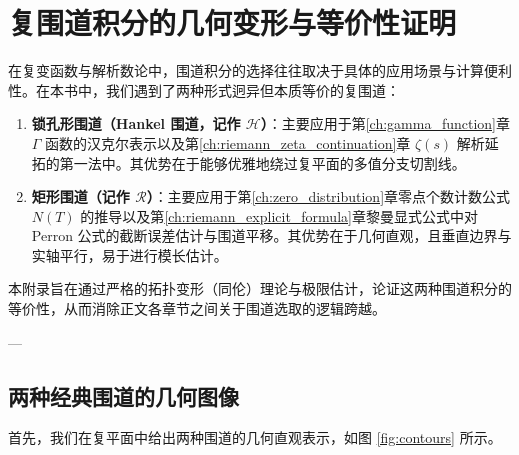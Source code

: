 

\chapter{复围道积分的几何变形与等价性证明}
\label{app:contour}

在复变函数与解析数论中，围道积分的选择往往取决于具体的应用场景与计算便利性。在本书中，我们遇到了两种形式迥异但本质等价的复围道：
\begin{enumerate}
    \item \textbf{锁孔形围道（Hankel 围道，记作 $\mathcal{H}$）}：主要应用于第\ref{ch:gamma_function}章 $\Gamma$ 函数的汉克尔表示以及第\ref{ch:riemann_zeta_continuation}章 $\zeta(s)$ 解析延拓的第一法中。其优势在于能够优雅地绕过复平面的多值分支切割线。
    \item \textbf{矩形围道（记作 $\mathcal{R}$）}：主要应用于第\ref{ch:zero_distribution}章零点个数计数公式 $N(T)$ 的推导以及第\ref{ch:riemann_explicit_formula}章黎曼显式公式中对 Perron 公式的截断误差估计与围道平移。其优势在于几何直观，且垂直边界与实轴平行，易于进行模长估计。
\end{enumerate}

本附录旨在通过严格的拓扑变形（同伦）理论与极限估计，论证这两种围道积分的等价性，从而消除正文各章节之间关于围道选取的逻辑跨越。

---

\section{两种经典围道的几何图像}

首先，我们在复平面中给出两种围道的几何直观表示，如图 \ref{fig:contours} 所示。

